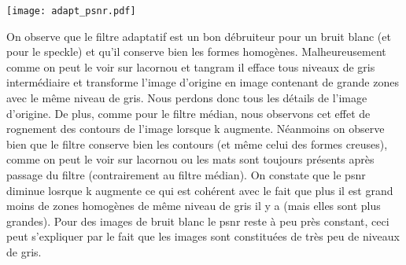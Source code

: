 \documentclass[12pt]{article}
\numberwithin{equation}{section}
\begin{document}
\begin{center}
\texttt{[image: adapt\_psnr.pdf]}\\
\end{center}

On observe que le filtre adaptatif est un bon débruiteur pour un bruit blanc (et pour le speckle) et qu'il conserve bien les formes homogènes. Malheureusement comme on peut le voir sur lacornou et tangram il efface tous niveaux de gris intermédiaire et transforme l'image d'origine en image contenant de grande zones avec le même niveau de gris. Nous perdons donc tous les détails de l'image d'origine. De plus, comme pour le filtre médian, nous observons cet effet de rognement des contours de l'image lorsque k augmente. Néanmoins on observe bien que le filtre conserve bien les contours (et même celui des formes creuses), comme on peut le voir sur lacornou ou les mats sont toujours présents après passage du filtre (contrairement au filtre médian). On constate que le psnr diminue losrque  k augmente ce qui est cohérent avec le fait que plus il est grand moins de zones homogènes de même niveau de gris il y a (mais elles sont plus grandes). Pour des images de bruit blanc le psnr reste à peu près constant, ceci peut s'expliquer par le fait que les images sont constituées de très peu de niveaux de gris.   
\end{document}
